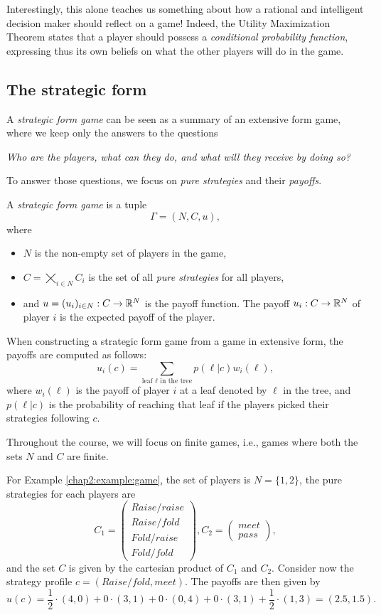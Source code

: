 Interestingly, this alone teaches us something about how a rational and intelligent decision maker should reflect on a game! Indeed, the Utility Maximization Theorem states that a player should possess a \emph{conditional probability function}, expressing thus its own beliefs on what the other players will do in the game.
\subsection{The strategic form}
\label{subsec:StratForm}

A \emph{strategic form game} can be seen as a summary of an extensive form game, where we keep only the answers to the questions
\begin{center}
\textit{Who are the players, what can they do, and what will they receive by doing so?}
\end{center}

To answer those questions, we focus on \emph{pure strategies} and their \emph{payoffs}.


\begin{definition}
A \emph{strategic form game} is a tuple
$$ \Gamma = (N, C, u),$$
where
\begin{itemize}
\item $N$ is the non-empty set of players in the game,
\item $C = \bigtimes_{i \in N}C_i$ is the set of all \emph{pure strategies} for all players,
\item and $u = (u_i)_{i \in N} : C \rightarrow \mathbb{R}^N$ is the payoff function.
The payoff $u_i : C \rightarrow \mathbb{R}^N$ of player $i$
is the expected payoff of the player.
\end{itemize}
When constructing a strategic form game from a game in extensive form, the payoffs are computed as follows:
$$u_i(c) = \sum_{\text{leaf $\ell$ in the tree}} p(\ell|c) w_i(\ell), $$
where $w_i(\ell)$ is the payoff of player $i$ at a leaf denoted by $\ell$ in the tree, and $p(\ell|c)$ is the probability of reaching that leaf if the players picked their strategies following $c$.
\end{definition}
Throughout the course, we will focus on finite games, i.e., games where both the sets $N$ and $C$ are finite.
\begin{example}
For Example \ref{chap2:example:game}, the set of players is $N = \{1,2\}$,
the pure strategies for each players are
 $$C_1 = \begin{pmatrix}
Raise/raise \\
Raise/fold \\
Fold/raise \\
Fold/fold
\end{pmatrix}, C_2 = \begin{pmatrix}
meet\\
pass
\end{pmatrix},$$
and the set $C$ is given by the cartesian product of $C_1$ and $C_2$.
Consider now the strategy profile $c = (Raise/fold, meet)$.
The payoffs are then given by
$$u(c) = \frac{1}{2} \cdot (4,0) + 0 \cdot (3,1)+ 0 \cdot (0,4) + 0 \cdot (3,1) + \frac{1}{2} \cdot (1,3) = (2.5,1.5).$$
\end{example}

